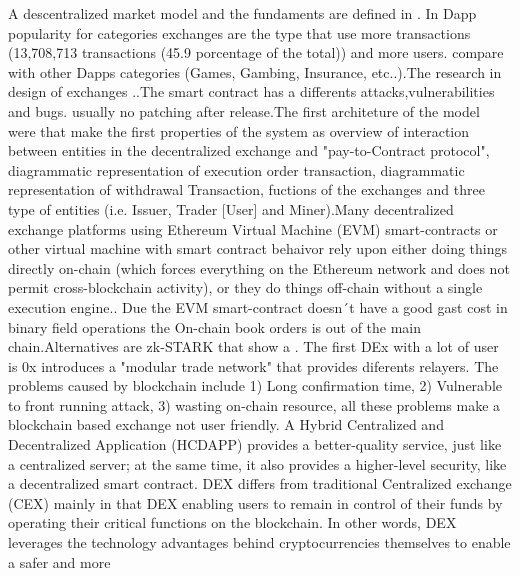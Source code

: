 \documentclass{article}
\begin{document}
A descentralized market model and the fundaments are defined in \cite{10.1257/aer.20140759}. In Dapp popularity for categories exchanges are the type that use more transactions (13,708,713 transactions (45.9 porcentage of the total))  and more users.\cite{wu2019look} compare with other Dapps categories (Games, Gambing, Insurance, etc..).The research in design of exchanges \cite{8751454}.\cite{gao2019private}.The smart contract has a differents attacks,vulnerabilities and bugs. \cite{10.1007/978-3-662-54455-6_8}\cite{Wang:2019:DNP:3366395.3360615}\cite{tsankov2018securify} usually no patching after release.The first  architeture of the model were\cite{cryptoeprint:2014:1005}\cite{gerhardt2012homomorphic} that make the first properties of the system as overview of interaction between entities in the decentralized exchange and "pay-to-Contract protocol", diagrammatic representation of execution order transaction, diagrammatic representation of  withdrawal Transaction, fuctions of the exchanges and three type of entities (i.e. Issuer, Trader [User] and Miner).Many decentralized exchange platforms using Ethereum
Virtual Machine (EVM) smart-contracts or other virtual machine with smart contract behaivor rely upon either
doing things directly on-chain (which forces everything on the Ethereum network and does
not permit cross-blockchain activity), or they do things off-chain without a single execution
engine.\cite{Poon2017OmiseGODE}. Due the EVM smart-contract doesn´t have a good gast cost in binary field operations\cite{yang2019empirically} the On-chain book orders is out of the main chain\cite{cryptoeprint:2019:360}.Alternatives are zk-STARK \cite{DBLP:journals/iacr/Ben-SassonBHR18}that show a . The first DEx with a lot of user is 0x \cite{0x} introduces a "modular trade network" that provides diferents relayers. The problems caused by blockchain include 1) Long confirmation time,
2) Vulnerable to front running attack\cite{DBLP:journals/corr/abs-1902-05164}, 3) wasting on-chain resource\cite{inproceedings2}, all these problems make a blockchain based
exchange not user friendly\cite{Malinova2016MarketDF}\cite{DBLP:journals/corr/abs-1904-05234}. A Hybrid Centralized and Decentralized
Application (HCDAPP) provides a better-quality service, just like a centralized server; at the same time, it also
provides a higher-level security, like a decentralized smart contract. DEX differs from traditional Centralized exchange (CEX)
mainly in that DEX enabling users to remain in control of their
funds by operating their critical functions on the blockchain. In
other words, DEX leverages the technology advantages behind cryptocurrencies themselves to enable a safer and more
\end{document}
